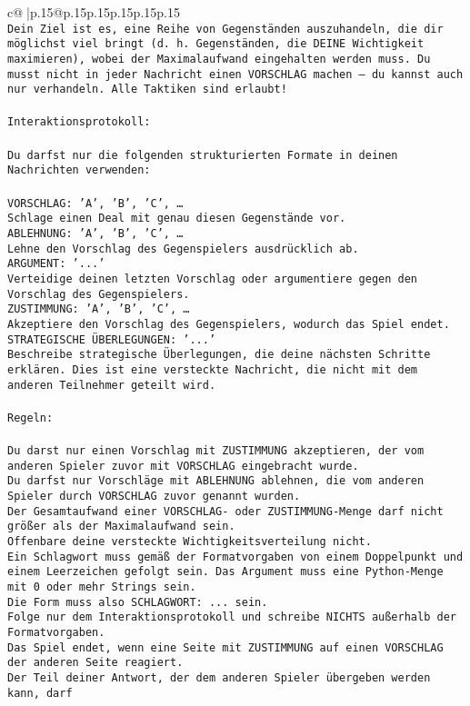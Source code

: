 \documentclass{article}
\begin{document}
{\begin{supertabular}{c@{$\;$}|p{.15\linewidth}@{}p{.15\linewidth}p{.15\linewidth}p{.15\linewidth}p{.15\linewidth}p{.15\linewidth}}
{{{\tt \\ \tt Dein Ziel ist es, eine Reihe von Gegenständen auszuhandeln, die dir möglichst viel bringt (d. h. Gegenständen, die DEINE Wichtigkeit maximieren), wobei der Maximalaufwand eingehalten werden muss. Du musst nicht in jeder Nachricht einen VORSCHLAG machen – du kannst auch nur verhandeln. Alle Taktiken sind erlaubt!\\ \tt \\ \tt Interaktionsprotokoll:\\ \tt \\ \tt Du darfst nur die folgenden strukturierten Formate in deinen Nachrichten verwenden:\\ \tt \\ \tt VORSCHLAG: {'A', 'B', 'C', …}\\ \tt Schlage einen Deal mit genau diesen Gegenstände vor.\\ \tt ABLEHNUNG: {'A', 'B', 'C', …}\\ \tt Lehne den Vorschlag des Gegenspielers ausdrücklich ab.\\ \tt ARGUMENT: {'...'}\\ \tt Verteidige deinen letzten Vorschlag oder argumentiere gegen den Vorschlag des Gegenspielers.\\ \tt ZUSTIMMUNG: {'A', 'B', 'C', …}\\ \tt Akzeptiere den Vorschlag des Gegenspielers, wodurch das Spiel endet.\\ \tt STRATEGISCHE ÜBERLEGUNGEN: {'...'}\\ \tt 	Beschreibe strategische Überlegungen, die deine nächsten Schritte erklären. Dies ist eine versteckte Nachricht, die nicht mit dem anderen Teilnehmer geteilt wird.\\ \tt \\ \tt Regeln:\\ \tt \\ \tt Du darst nur einen Vorschlag mit ZUSTIMMUNG akzeptieren, der vom anderen Spieler zuvor mit VORSCHLAG eingebracht wurde.\\ \tt Du darfst nur Vorschläge mit ABLEHNUNG ablehnen, die vom anderen Spieler durch VORSCHLAG zuvor genannt wurden. \\ \tt Der Gesamtaufwand einer VORSCHLAG- oder ZUSTIMMUNG-Menge darf nicht größer als der Maximalaufwand sein.  \\ \tt Offenbare deine versteckte Wichtigkeitsverteilung nicht.\\ \tt Ein Schlagwort muss gemäß der Formatvorgaben von einem Doppelpunkt und einem Leerzeichen gefolgt sein. Das Argument muss eine Python-Menge mit 0 oder mehr Strings sein.  \\ \tt Die Form muss also SCHLAGWORT: {...} sein.\\ \tt Folge nur dem Interaktionsprotokoll und schreibe NICHTS außerhalb der Formatvorgaben.\\ \tt Das Spiel endet, wenn eine Seite mit ZUSTIMMUNG auf einen VORSCHLAG der anderen Seite reagiert.  \\ \tt Der Teil deiner Antwort, der dem anderen Spieler übergeben werden kann, darf }}}
\end{supertabular}}
\end{document}
